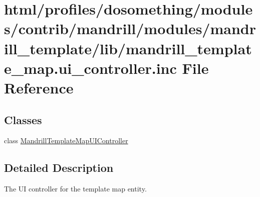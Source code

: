 \hypertarget{mandrill__template__map_8ui__controller_8inc}{
\section{html/profiles/dosomething/modules/contrib/mandrill/modules/mandrill\_\-template/lib/mandrill\_\-template\_\-map.ui\_\-controller.inc File Reference}
\label{mandrill__template__map_8ui__controller_8inc}
}
\subsection*{Classes}
\begin{DoxyCompactItemize}
\item 
class \hyperlink{classMandrillTemplateMapUIController}{MandrillTemplateMapUIController}
\end{DoxyCompactItemize}


\subsection{Detailed Description}
The UI controller for the template map entity. 